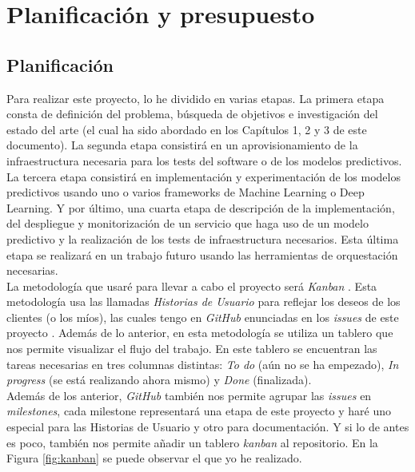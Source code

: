 \chapter{Planificación y presupuesto}

\section{Planificación}

Para realizar este proyecto, lo he dividido en varias etapas. La primera etapa consta de definición del problema, búsqueda de objetivos e investigación del estado del arte (el cual ha sido abordado en los Capítulos 1, 2 y 3 de este documento). La segunda etapa consistirá en un aprovisionamiento de la infraestructura necesaria para los tests del software o de los modelos predictivos. La tercera etapa consistirá en implementación y experimentación de los modelos predictivos usando uno o varios frameworks de Machine Learning o Deep Learning. Y por último, una cuarta etapa de descripción de la implementación, del despliegue y monitorización de un servicio que haga uso de un modelo predictivo y la realización de los tests de infraestructura necesarios. Esta última etapa se realizará en un trabajo futuro usando las herramientas de orquestación necesarias.\\

La metodología que usaré para llevar a cabo el proyecto será \textit{Kanban} \cite{kanban}. Esta metodología usa las llamadas \textit{Historias de Usuario} para reflejar los deseos de los clientes (o los míos), las cuales tengo en \textit{GitHub} enunciadas en los \textit{issues} de este proyecto \cite{issues}. Además de lo anterior, en esta metodología se utiliza un tablero que nos permite visualizar el flujo del trabajo. En este tablero se encuentran las tareas necesarias en tres columnas distintas: \textit{To do} (aún no se ha empezado), \textit{In progress} (se está realizando ahora mismo) y \textit{Done} (finalizada).\\

Además de los anterior, \textit{GitHub} también nos permite agrupar las \textit{issues} en \textit{milestones}, cada milestone representará una etapa de este proyecto y haré uno especial para las Historias de Usuario y otro para documentación. Y si lo de antes es poco, también nos permite añadir un tablero \textit{kanban} al repositorio. En la Figura \ref{fig:kanban} se puede observar el que yo he realizado.\\

